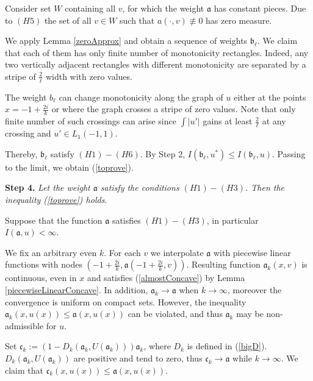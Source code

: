 \documentclass[12pt]{article}
\renewcommand{\le}{\leqslant}
\begin{document}
Consider set $W$ containing all $v$, for which the weight $\mathfrak a$ has constant pieces.
Due to $(H5)$ the set of all  $v \in W$ such that $a(\cdot, v) \not\equiv 0$ has zero measure.

We apply Lemma \ref{zeroApprox} and obtain a sequence of weights $\mathfrak b_{\ell}$.
We claim that each of them has only finite number of monotonicity rectangles.
Indeed, any two vertically adjacent rectangles with different monotonicity
are separated by a stripe of $\frac{2}{\ell}$ width with zero values.

The weight $b_{\ell}$ can change monotonicity along the graph of $u$
either at the points $x = -1 + \frac{2 i}{k}$ or where the graph crosses a stripe of zero values.
Note that only finite number of such crossings can arise since
$\int |u'|$ gains at least $\frac{2}{\ell}$ at any crossing and $u' \in L_1(-1, 1)$.

Thereby, $\mathfrak b_{\ell}$ satisfy $(H1)-(H6)$. By Step 2, $I(\mathfrak b_{\ell}, u^*) \le I(\mathfrak b_{\ell}, u)$.
Passing to the limit, we obtain (\ref{toprove}).

\bigskip
{\bf Step 4.} {\it Let the weight $\mathfrak a$ satisfy the conditions $(H1)-(H3)$.
Then the inequality (\ref{toprove}) holds.}

Suppose that the function $\mathfrak a$ satisfies $(H1)-(H3)$, in particular $I(\mathfrak a, u) < \infty$.

We fix an arbitrary even $k$.
For each $v$ we interpolate $\mathfrak a$ with piecewise linear functions
with nodes $( -1 + \frac{2i}{k}, \mathfrak a(-1 + \frac{2i}{k}, v) )$.
Resulting function $\mathfrak a_k(x, v)$ is continuous, even in $x$
and satisfies (\ref{almostConcave}) by Lemma \ref{piecewiseLinearConcave}.
In addition, $\mathfrak a_k \to \mathfrak a$ when $k \to \infty$,
moreover the convergence is uniform on compact sets.
However, the inequality $\mathfrak a_k(x, u(x)) \le \mathfrak a(x, u(x))$ can be violated,
and thus $\mathfrak a_k$ may be non-admissible for $u$.

Set $\mathfrak c_k := (1 - D_k(\mathfrak a_k, U(\mathfrak a_k))) \mathfrak a_k$, where $D_k$ is defined in (\ref{bigD}).
$D_k(\mathfrak a_k, U(\mathfrak a_k))$ are positive and tend to zero, thus $\mathfrak c_k \to \mathfrak a$ while $k \to \infty$.
We claim that $\mathfrak c_k(x, u(x)) \le \mathfrak a(x, u(x))$.
\end{document}
